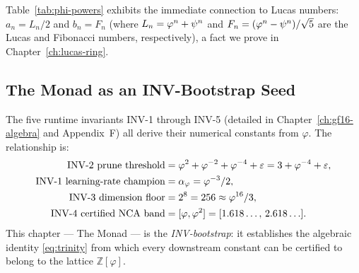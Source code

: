 \begin{table}[htbp]
\centering
\caption{Integer representations $\phipow{n} = a_n + b_n\varphi$
         for small $|n|$.}\label{tab:phi-powers}
\end{table}

Table~\ref{tab:phi-powers} exhibits the immediate connection to Lucas
numbers: $a_n = L_n/2$ and $b_n = F_n$ (where $L_n = \varphi^{n} + \psi^n$
and $F_n = (\varphi^{n} - \psi^n)/\sqrt{5}$ are the Lucas and Fibonacci
numbers, respectively), a fact we prove in Chapter~\ref{ch:lucas-ring}.

\subsection{The Monad as an INV-Bootstrap Seed}

The five runtime invariants INV-1 through INV-5 (detailed in
Chapter~\ref{ch:gf16-algebra} and Appendix~F) all derive their numerical
constants from $\varphi$.  The relationship is:
\begin{align}
  \text{INV-2 prune threshold} &= \varphi^{2} + \varphi^{-2} + \varphi^{-4} + \varepsilon
    = 3 + \varphi^{-4} + \varepsilon, \label{eq:inv2-threshold}\\
  \text{INV-1 learning-rate champion} &= \alpha_\varphi = \varphi^{-3}/2,
    \label{eq:inv1-lr}\\
  \text{INV-3 dimension floor} &= 2^8 = 256 \approx \varphi^{16}/3,
    \label{eq:inv3-dim}\\
  \text{INV-4 certified NCA band} &= [\varphi, \varphi^{2}]
    = [1.618\ldots,\,2.618\ldots]. \label{eq:inv4-band}
\end{align}
This chapter — The Monad — is the \emph{INV-bootstrap}: it establishes the
algebraic identity \eqref{eq:trinity} from which every downstream constant
can be certified to belong to the lattice $\mathbb{Z}[\varphi]$.

